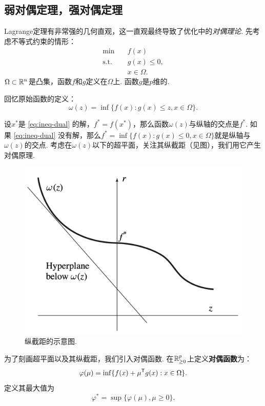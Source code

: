 

\subsection{弱对偶定理，强对偶定理}
Lagrange定理有非常强的几何直观，这一直观最终导致了优化中的\emph{对偶理论}. 先考虑不等式约束的情形：
\begin{equation}
    \begin{aligned}
    \min\quad & f({x})\\
    \text{s.t.}\quad& {g(x)\le 0},\\
    &{x}\in\Omega.
\end{aligned}\label{eq:ineq-dual}
\end{equation}
$\Omega\subset \mathbb{R}^n$是凸集，函数$f$和${g}$定义在$\Omega$上. 函数${g}$是$p$维的. 

回忆原始函数的定义：
        $$\omega({z})=\inf \{f({x}):g(x)\le z,x\in\Omega\}.$$

设$x^\ast$是 \eqref{eq:ineq-dual} 的解，$f^\ast=f(x^\ast)$，那么函数$\omega(z)$与纵轴的交点是$f^*$. 如果 \eqref{eq:ineq-dual} 没有解，那么$f^*=\inf\{f(x):g(x)\leq 0,x\in\Omega\}$就是纵轴与$\omega(z)$的交点. 考虑在$\omega(z)$以下的超平面，关注其纵截距（见图），我们用它产生对偶原理.
\begin{figure}
    \centering
    \includegraphics[scale=0.2]{Chapters/duality/figures/hyperplane-below.png}
    \caption{纵截距的示意图.}
    \label{fig:hyperplane-below}
\end{figure}

为了刻画超平面以及其纵截距，我们引入对偶函数. 在$\mathbb{R}^p_{\geq 0}$上定义\textbf{对偶函数}为：
$$\varphi({\mu})=\inf \{f({x})+{\mu^{\mathsf{T}} g(x)}:{x}\in\Omega\}.$$
定义其最大值为
    \[\varphi^*=\sup\{\varphi(\mu),\mu\geq 0\}.\]

